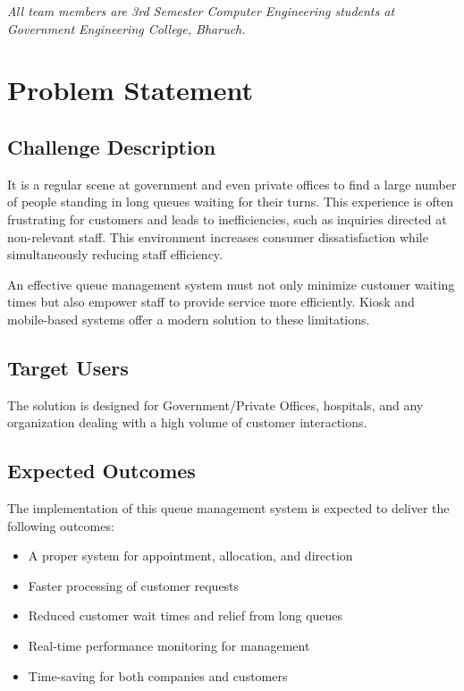 \documentclass[12pt,a4paper]{report}
\begin{document}
\vspace{0.5cm}

\noindent\textit{All team members are 3rd Semester Computer Engineering students at Government Engineering College, Bharuch.}

\newpage
\chapter{Problem Statement}

\section{Challenge Description}

It is a regular scene at government and even private offices to find a large number of people standing in long queues waiting for their turns. This experience is often frustrating for customers and leads to inefficiencies, such as inquiries directed at non-relevant staff. This environment increases consumer dissatisfaction while simultaneously reducing staff efficiency. 

An effective queue management system must not only minimize customer waiting times but also empower staff to provide service more efficiently. Kiosk and mobile-based systems offer a modern solution to these limitations.

\section{Target Users}

The solution is designed for Government/Private Offices, hospitals, and any organization dealing with a high volume of customer interactions.

\section{Expected Outcomes}

The implementation of this queue management system is expected to deliver the following outcomes:

\begin{itemize}
    \item A proper system for appointment, allocation, and direction
    \item Faster processing of customer requests
    \item Reduced customer wait times and relief from long queues
    \item Real-time performance monitoring for management
    \item Time-saving for both companies and customers
\end{itemize}
\end{document}
